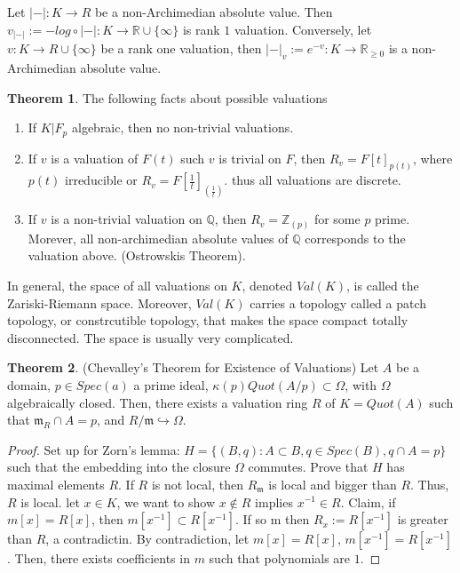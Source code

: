 \documentclass{article}
\theoremstyle{definition}
\newtheorem{theorem}{Theorem}[section]
\theoremstyle{definition}
\theoremstyle{definition}
\theoremstyle{definition}
\theoremstyle{definition}
\theoremstyle{definition}
\theoremstyle{definition}
\begin{document}
Let $|-|: K\to R$ be a non-Archimedian absolute value. Then $v_{|-|}:=- log\circ |-|:K\to \mathbb{R}\cup \{\infty\} $ is rank $1$ valuation. Conversely, let $v: K\to R\cup \{\infty\}$ be a rank one valuation, then $|-|_{v}:=e^{-v}: K\to \mathbb{R}_{\geq 0}$ is a non-Archimedian absolute value. 


\begin{tcolorbox}[colback=red!5!white,colframe=red!30!white]
\begin{theorem}
    The following facts about possible valuations
\begin{enumerate}
    \item If $K|F_p$ algebraic, then no non-trivial valuations.
    \item If $v$ is a valuation of $F(t)$ such $v$ is trivial on $F$, then $R_v=F[t]_{p(t)}$, where $p(t)$ irreducible or $R_v=F[\frac{1}{t}]_{(\frac{1}{t})}$. thus all valuations are discrete. 
    \item If $v$ is a non-trivial valuation on $\mathbb{Q}$, then $R_v=\mathbb{Z}_{(p)}$ for some $p$ prime. Morever, all non-archimedian absolute values of $\mathbb{Q}$ corresponds to the valuation above. (Ostrowskis Theorem).
\end{enumerate}
\end{theorem}
\end{tcolorbox}
In general, the space of all valuations on $K$, denoted $Val(K)$, is called the Zariski-Riemann space. Moreover, $Val(K)$ carries a topology called a patch topology, or constrcutible topology, that makes the space compact totally disconnected. The space is usually very complicated.


\begin{tcolorbox}[colback=red!5!white,colframe=red!30!white]
\begin{theorem}
(Chevalley's Theorem for Existence of Valuations) Let $A$ be a domain, $p\in Spec(a)$ a prime ideal, $\kappa(p)Quot(A/p)\subset \Omega$, with $\Omega$ algebraically closed. Then, there exists a valuation ring $R$ of $K=Quot(A)$ such that $\mathfrak{m}_R\cap A=p$, and $R/\mathfrak{m}\hookrightarrow \Omega$.
\end{theorem}
\end{tcolorbox}
\begin{proof}
    Set up for Zorn's lemma: $H=\{ (B,q): A\subset B, q\in Spec(B), q\cap A=p \}$ such that the embedding into the closure $\Omega$ commutes. Prove that $H$ has maximal elements $R$. If $R$ is not local, then $R_{\mathfrak{m}}$ is local and bigger than $R$. Thus, $R$ is local. let $x\in K$, we want to show $x\not \in R$ implies $x^{-1}\in R$. Claim, if $m[x]=R[x]$, then $m[x^{-1}]\subset R[x^{-1}]$. If so m then $R_x:=R[x^{-1}]$ is greater than $R$, a contradictin. By contradiction, let $m[x]=R[x]$, $m[x^{-1}]=R[x^{-1}]$. Then, there exists coefficients in $m$ such that polynomials are $1$.  
\end{proof}
\end{document}
